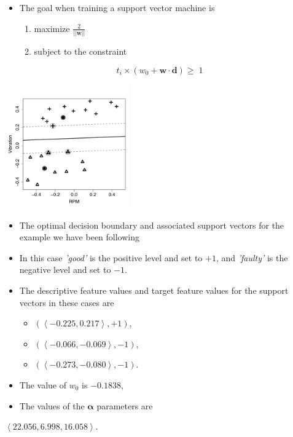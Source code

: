 \documentclass[xcolor={table}]{beamer}
\newcommand{\featL}[1]{\textit{'#1'}}
\begin{document}
 \begin{frame} 
 \begin{itemize}
\item The goal when training a support vector machine is
\begin{enumerate}
	\item \alert{maximize} $ \frac{2}{||\mathbf{w}||}$ 
	\item \alert{subject to the constraint} 
\end{enumerate}
\end{itemize}
\begin{equation*}
t_i\times(w_0 + \mathbf{w}\cdot\mathbf{d})  \ge \;1
\end{equation*}
\end{frame} 

 \begin{frame} 
\begin{center}
 \includegraphics[width=0.4\textwidth]{./images/svmQueriesImage.pdf}
 \end{center}
\begin{itemize}  
\item The optimal decision boundary and associated support vectors for the example we have been following 
\item In this case  \featL{good} is the positive level and set to $+1$, and \featL{faulty} is the negative level and set to $-1$. 
\end{itemize}
\end{frame}

\begin{frame}
\begin{itemize}
\item The descriptive feature values and target feature values for the support vectors in these cases are
\begin{itemize}
	\item  $(\left< -0.225, 0.217 \right>, +1)$, 
	\item $(\left<-0.066, -0.069\right>, -1)$, 
	\item $(\left<-0.273, -0.080\right>, -1)$. 
\end{itemize}
\item The value of $w_0$ is $-0.1838$, 
\item The values of the $\pmb{\alpha}$ parameters are 
\end{itemize}
\begin{center}
$\left< 22.056, 6.998, 16.058 \right>$. 
\end{center}
\end{frame} 
\end{document}
